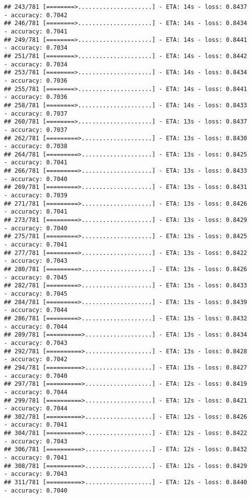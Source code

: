 \documentclass[
]{article}
\begin{document}
\begin{verbatim}
## 243/781 [========>.....................] - ETA: 14s - loss: 0.8437 - accuracy: 0.7042
## 246/781 [========>.....................] - ETA: 14s - loss: 0.8434 - accuracy: 0.7041
## 249/781 [========>.....................] - ETA: 14s - loss: 0.8441 - accuracy: 0.7034
## 251/781 [========>.....................] - ETA: 14s - loss: 0.8442 - accuracy: 0.7034
## 253/781 [========>.....................] - ETA: 14s - loss: 0.8434 - accuracy: 0.7036
## 255/781 [========>.....................] - ETA: 14s - loss: 0.8441 - accuracy: 0.7036
## 258/781 [========>.....................] - ETA: 14s - loss: 0.8433 - accuracy: 0.7037
## 260/781 [========>.....................] - ETA: 13s - loss: 0.8437 - accuracy: 0.7037
## 262/781 [=========>....................] - ETA: 13s - loss: 0.8430 - accuracy: 0.7038
## 264/781 [=========>....................] - ETA: 13s - loss: 0.8425 - accuracy: 0.7041
## 266/781 [=========>....................] - ETA: 13s - loss: 0.8433 - accuracy: 0.7040
## 269/781 [=========>....................] - ETA: 13s - loss: 0.8431 - accuracy: 0.7039
## 271/781 [=========>....................] - ETA: 13s - loss: 0.8426 - accuracy: 0.7041
## 273/781 [=========>....................] - ETA: 13s - loss: 0.8429 - accuracy: 0.7040
## 275/781 [=========>....................] - ETA: 13s - loss: 0.8425 - accuracy: 0.7041
## 277/781 [=========>....................] - ETA: 13s - loss: 0.8422 - accuracy: 0.7043
## 280/781 [=========>....................] - ETA: 13s - loss: 0.8426 - accuracy: 0.7045
## 282/781 [=========>....................] - ETA: 13s - loss: 0.8433 - accuracy: 0.7045
## 284/781 [=========>....................] - ETA: 13s - loss: 0.8439 - accuracy: 0.7044
## 286/781 [=========>....................] - ETA: 13s - loss: 0.8432 - accuracy: 0.7044
## 289/781 [==========>...................] - ETA: 13s - loss: 0.8434 - accuracy: 0.7043
## 292/781 [==========>...................] - ETA: 13s - loss: 0.8428 - accuracy: 0.7042
## 294/781 [==========>...................] - ETA: 13s - loss: 0.8427 - accuracy: 0.7040
## 297/781 [==========>...................] - ETA: 12s - loss: 0.8419 - accuracy: 0.7044
## 299/781 [==========>...................] - ETA: 12s - loss: 0.8421 - accuracy: 0.7044
## 302/781 [==========>...................] - ETA: 12s - loss: 0.8426 - accuracy: 0.7041
## 304/781 [==========>...................] - ETA: 12s - loss: 0.8422 - accuracy: 0.7043
## 306/781 [==========>...................] - ETA: 12s - loss: 0.8432 - accuracy: 0.7041
## 308/781 [==========>...................] - ETA: 12s - loss: 0.8429 - accuracy: 0.7043
## 311/781 [==========>...................] - ETA: 12s - loss: 0.8440 - accuracy: 0.7040

\end{verbatim}
\end{document}
